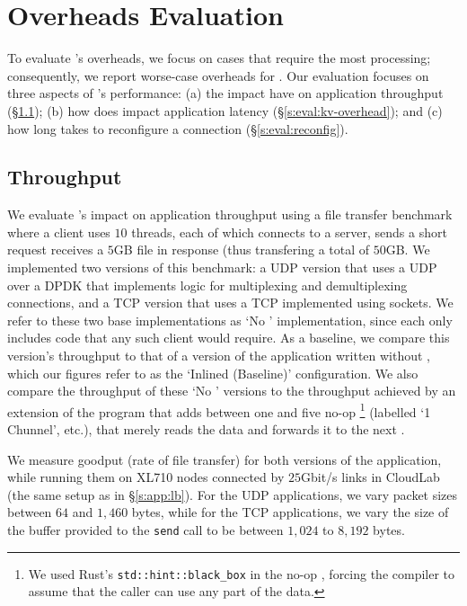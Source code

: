 \section{\name Overheads Evaluation}\label{s:eval}
To evaluate \name's overheads, we focus on cases that require the most processing; consequently, we report worse-case overheads for \name. Our evaluation focuses on three aspects of \name's performance: (a) the impact \tunnels have on application throughput (\S\ref{s:eval:tput}); (b) how does \name impact application latency (\S\ref{s:eval:kv-overhead}); and (c) how long \name takes to reconfigure a connection (\S\ref{s:eval:reconfig}).



\subsection{Throughput}\label{s:eval:tput}


We evaluate \name's impact on application throughput using a file transfer benchmark where a client uses $10$ threads, each of which connects to a server, sends a short request receives a $5$GB file in response (thus transfering a total of $50$GB. We implemented two versions of this benchmark: a UDP version that uses a UDP \tunnel over a DPDK \tunnel that implements logic for multiplexing and demultiplexing connections, and a TCP version that uses a TCP \tunnel implemented using sockets. We refer to these two base implementations as `No \tunnel' implementation, since each only includes code that any such client would require. As a baseline, we compare this version's throughput to that of a version of the application written without \name, which our figures refer to as the `Inlined (Baseline)' configuration.
We also compare the throughput of these `No \tunnel' versions to the throughput achieved by an extension of the program that adds between one and five no-op \tunnels\footnote{We used Rust's \texttt{std::hint::black\_box} in the no-op \tunnel, forcing the compiler to assume that the caller can use any part of the data.} (labelled `1 Chunnel', etc.), that merely reads the data and forwards it to the next \tunnel. 

We measure goodput (\ie rate of file transfer) for both versions of the application, while running them on XL710 nodes connected by $25$Gbit/s links in CloudLab (the same setup as in \S\ref{s:app:lb}). For the UDP applications, we vary packet sizes between $64$ and $1,460$ bytes, while for the TCP applications, we vary the size of the buffer provided to the \texttt{send} call to be between $1,024$ to $8,192$ bytes.%

